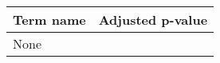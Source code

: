 \begin{tabular}{ll}
\toprule
Term name & Adjusted p-value \\
\midrule
     None &                  \\
\bottomrule
\end{tabular}
